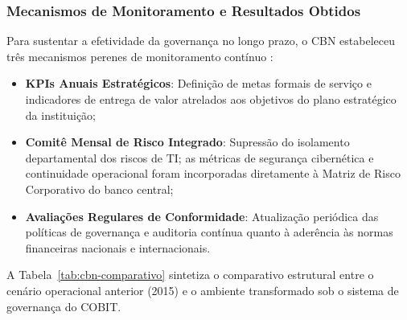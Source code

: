 \subsubsection{Mecanismos de Monitoramento e Resultados Obtidos}

Para sustentar a efetividade da governança no longo prazo, o CBN estabeleceu três mecanismos perenes de monitoramento contínuo \cite{teitler2022case}:

\begin{itemize}
    \item \textbf{KPIs Anuais Estratégicos}: Definição de metas formais de serviço e indicadores de entrega de valor atrelados aos objetivos do plano estratégico da instituição;
    \item \textbf{Comitê Mensal de Risco Integrado}: Supressão do isolamento departamental dos riscos de TI; as métricas de segurança cibernética e continuidade operacional foram incorporadas diretamente à Matriz de Risco Corporativo do banco central;
    \item \textbf{Avaliações Regulares de Conformidade}: Atualização periódica das políticas de governança e auditoria contínua quanto à aderência às normas financeiras nacionais e internacionais.
\end{itemize}

A Tabela~\ref{tab:cbn-comparativo} sintetiza o comparativo estrutural entre o cenário operacional anterior (2015) e o ambiente transformado sob o sistema de governança do COBIT.

